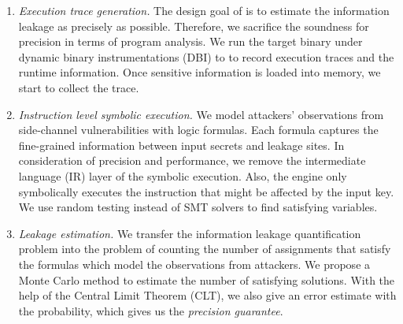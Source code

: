 \begin{enumerate}
    \item \emph{Execution trace generation.} The design goal of \tool{} is to
          estimate the information leakage as precisely as possible. Therefore,
          we sacrifice the soundness for precision in terms of program
          analysis. We run the target binary under dynamic binary instrumentations (DBI) to
          to record execution traces and the runtime information.
          Once sensitive information is loaded into memory, we start to collect the 
          trace.
    \item \emph{Instruction level symbolic execution.} We model attackers'
          observations from side-channel vulnerabilities with logic formulas.
          Each formula captures the fine-grained information between input
          secrets and leakage sites. In consideration of precision and
          performance, we remove the intermediate language (IR) layer of the
          symbolic execution. Also, the engine only symbolically executes the
          instruction that might be affected by the input key. We use random
          testing instead of SMT solvers to find satisfying variables. 
    \item \emph{Leakage estimation.} We transfer the information leakage quantification
          problem into the problem of counting the number of assignments that satisfy the
          formulas which model the observations from attackers. We propose a
          Monte Carlo method to estimate the number of satisfying solutions.
          With the help of the Central Limit Theorem (CLT),
          we also give an error estimate with the probability,
          which gives us the \emph{precision guarantee}.

\end{enumerate}



